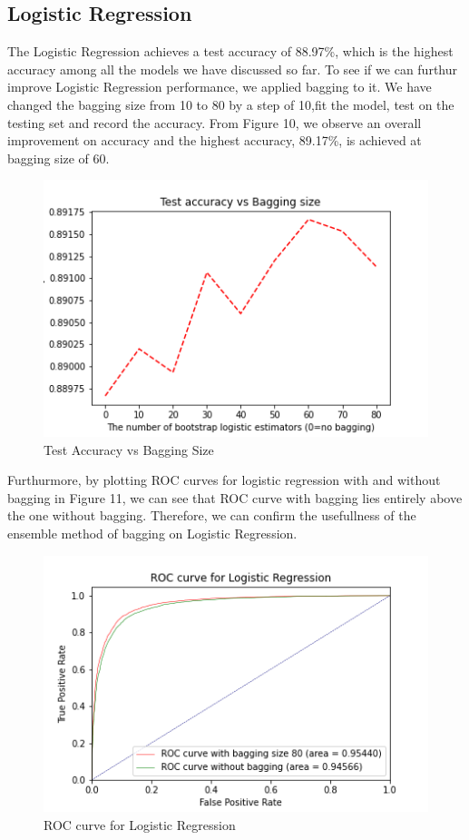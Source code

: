 \documentclass[10pt,twocolumn]{article}
\begin{document}
	\subsection{Logistic Regression}
	The Logistic Regression achieves a test accuracy of 88.97\%, which is the highest accuracy among all the models we have discussed so far. To see if we can furthur improve Logistic Regression performance, we applied bagging to it. We have changed the bagging size from 10 to 80 by a step of 10,fit the model, test on the testing set and record the accuracy. From Figure 10, we observe an overall improvement on accuracy and the highest accuracy, 89.17\%, is achieved at bagging size of 60.
	\newpage
	\begin{figure}[H]
		\includegraphics[width=\columnwidth]{Logistic_bagging}
		\caption{Test Accuracy vs Bagging Size}\label{Logistic_bagging}
	\end{figure} 	
	Furthurmore, by plotting ROC curves for logistic regression with and without bagging in Figure 11, we can see that ROC curve with bagging lies entirely above the one without bagging. Therefore, we can confirm the usefullness of the ensemble method of bagging on Logistic Regression.
	
	\begin{figure}[htbp]
		\includegraphics[width=\columnwidth]{ROCComparsion}
		\caption{ROC curve for Logistic Regression}\label{ROCComparsion}
	\end{figure} 	
\end{document}
